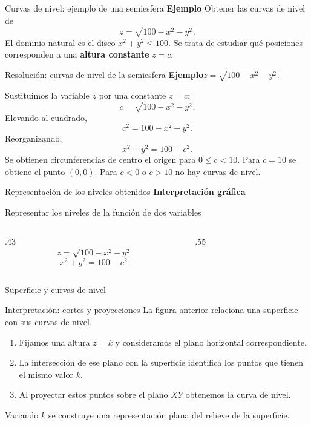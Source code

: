 \documentclass[main.tex]{subfiles}
\begin{document}
\begin{frame}{Curvas de nivel: ejemplo de una semiesfera}
\textbf{Ejemplo}
\vfill
Obtener las curvas de nivel de
\[z=\sqrt{100-x^2-y^2}.\]
\medskip
El dominio natural es el disco $x^2+y^2\leq100$.
Se trata de estudiar qué posiciones corresponden a una
\textbf{altura constante} $z=c$.
\vfill
\end{frame}
\begin{frame}{Resolución: curvas de nivel de la semiesfera}
\small\textbf{Ejemplo}\quad $z=\sqrt{100-x^2-y^2}$.
\medskip

Sustituimos la variable $z$ por una constante $z=c$:
\[c=\sqrt{100-x^2-y^2}.\]
Elevando al cuadrado,
\[c^2=100-x^2-y^2.\]
Reorganizando,
\[x^2+y^2=100-c^2.\]
Se obtienen circunferencias de centro el origen para $0\le c<10$. Para $c=10$ se obtiene el punto $(0,0)$. Para $c<0$ o $c>10$ no hay curvas de nivel.
\end{frame}
\begin{frame}{Representación de los niveles obtenidos}
\textbf{Interpretación gráfica}\par
Representar los niveles de la función de dos variables
\begin{columns}[c]
\begin{column}{.43\textwidth}
\[z=\sqrt{100-x^2-y^2}\]
\[x^2+y^2=100-c^2\]
\end{column}
\begin{column}{.55\textwidth}\end{column}
\end{columns}
\end{frame}
\begin{frame}{Superficie y curvas de nivel}
\end{frame}
\begin{frame}{Interpretación: cortes y proyecciones}
La figura anterior relaciona una superficie con sus curvas de nivel.
\medskip
\begin{enumerate}
\item Fijamos una altura $z=k$ y consideramos el plano horizontal correspondiente.
\medskip
\item La intersección de ese plano con la superficie identifica los puntos que tienen el mismo valor $k$.
\medskip
\item Al proyectar estos puntos sobre el plano $XY$ obtenemos la curva de nivel.
\end{enumerate}
\medskip
Variando $k$ se construye una representación plana del relieve
de la superficie.
\end{frame}
\end{document}
